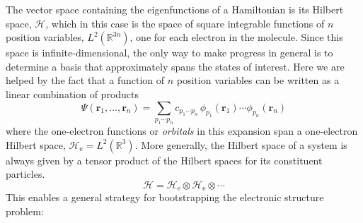 The vector space containing the eigenfunctions of a Hamiltonian is its Hilbert
space, \(\mathcal{H}\), which in this case is the space of square integrable
functions of \(n\) position variables,
\(
    L^2(\mathbb{R}^{3n})
\),
one for each electron in the molecule.
Since this space is infinite-dimensional, the only way to make progress in
general is to determine a basis that approximately spans the states of interest.
Here we are helped by the fact that a function of \(n\) position variables can
be written as a linear combination of products
\begin{equation}
    \Psi(\mathbf{r}_1, \dots, \mathbf{r}_n)
    =
    \sum_{p_1\cdots p_n}
    c_{p_1\cdots p_n}\,
    \phi_{p_1}(\mathbf{r}_1)
    \cdots
    \phi_{p_n}(\mathbf{r}_n)
\end{equation}
where the one-electron functions or {\itshape orbitals} in this expansion span a
one-electron Hilbert space,
\(
    \mathcal{H}_\mathrm{e}
    =
    L^2(\mathbb{R}^3)
\).
More generally, the Hilbert space of a system is always given by a tensor
product of the Hilbert spaces for its constituent particles.
\begin{equation}
    \mathcal{H}
    =
    \mathcal{H}_\mathrm{e}
    \otimes
    \mathcal{H}_\mathrm{e}
    \otimes
    \cdots
\end{equation}
This enables a general strategy for bootstrapping the electronic structure
problem:
